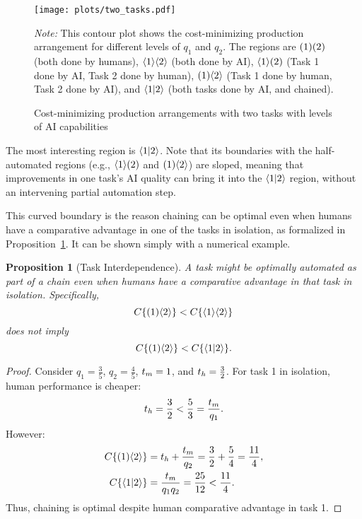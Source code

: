 \documentclass{article}
\theoremstyle{plain}
\theoremstyle{plain}
\newtheorem{proposition}[theorem]{Proposition}
\begin{document}
\begin{figure}
  \caption{Cost-minimizing production arrangements with two tasks with levels of AI capabilities} \label{fig:two_tasks}
  \begin{center}
  \texttt{[image: plots/two\_tasks.pdf]} \\
  \end{center}
\begin{footnotesize}
  \emph{Note:} This contour plot shows the cost-minimizing production arrangement for different levels of \(q_1\) and \(q_2\).
  The regions are \(( 1 )( 2 )\) (both done by humans), \(\langle 1 \rangle\langle 2 \rangle\) (both done by AI), \(\langle 1 \rangle( 2 )\) (Task 1 done by AI, Task 2 done by human), \(( 1 )\langle 2 \rangle\) (Task 1 done by human, Task 2 done by AI), and \(\langle 1|2 \rangle\) (both tasks done by AI, and chained).
\end{footnotesize}
\end{figure}

The most interesting region is \(\langle 1|2 \rangle\).
Note that its boundaries with the half-automated regions (e.g., \(\langle 1 \rangle( 2 )\) and \(( 1 )\langle 2 \rangle\)) are sloped, meaning that improvements in one task's AI quality can bring it into the \(\langle 1|2 \rangle\) region, without an intervening partial automation step.

This curved boundary is the reason chaining can be optimal even when humans have a comparative advantage in one of the tasks in isolation, as formalized in Proposition~\ref{proposition:interdependence}.
It can be shown simply with a numerical example.

\begin{proposition}[Task Interdependence] \label{proposition:interdependence}
A task might be optimally automated as part of a chain even when humans have a comparative advantage in that task in isolation.
Specifically, 
\[
C\{ ( 1 )\langle 2 \rangle \} < C\{ \langle 1 \rangle\langle 2 \rangle \}
\]
does not imply 
\[
C\{ ( 1 )\langle 2 \rangle \} < C\{ \langle 1|2 \rangle \}.
\]
\end{proposition}
\begin{proof}
Consider \(q_1 = \frac{3}{5}\), \(q_2 = \frac{4}{5}\), \(t_{m} = 1\), and \(t_{h} = \frac{3}{2}\).
For task 1 in isolation, human performance is cheaper: 
\[
t_{h} = \frac{3}{2} < \frac{5}{3} = \frac{t_{m}}{q_1}.
\]
However:
\begin{align*}
    C\{ ( 1 )\langle 2 \rangle \} &= t_{h} + \frac{t_{m}}{q_2} = \frac{3}{2} + \frac{5}{4} = \frac{11}{4}, \\
    C\{ \langle 1|2 \rangle \} &= \frac{t_{m}}{q_1 q_2} = \frac{25}{12} < \frac{11}{4}.
\end{align*}
Thus, chaining is optimal despite human comparative advantage in task 1.
\end{proof}
\end{document}
